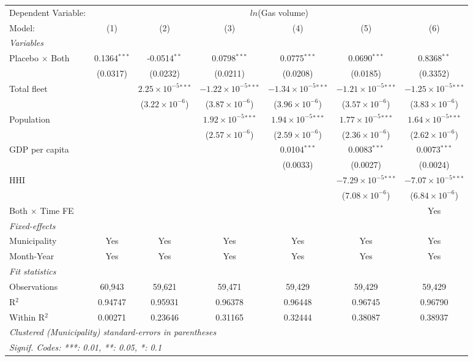 \documentclass[
]{article}
\begin{document}
\begin{tabular}{lcccccc}
\tabularnewline\midrule\midrule
Dependent Variable:&\multicolumn{6}{c}{$ln$(Gas volume)}\\
Model:&(1) & (2) & (3) & (4) & (5) & (6)\\
\midrule \emph{Variables}&   &   &   &   &   &  \\
Placebo $\times $ Both & 0.1364$^{***}$ & -0.0514$^{**}$ & 0.0798$^{***}$ & 0.0775$^{***}$ & 0.0690$^{***}$ & 0.8368$^{**}$\\
  &(0.0317) & (0.0232) & (0.0211) & (0.0208) & (0.0185) & (0.3352)\\
Total fleet &    & $2.25\times 10^{-5}$$^{***}$ & $-1.22\times 10^{-5}$$^{***}$ & $-1.34\times 10^{-5}$$^{***}$ & $-1.21\times 10^{-5}$$^{***}$ & $-1.25\times 10^{-5}$$^{***}$\\
  &   & ($3.22\times 10^{-6}$) & ($3.87\times 10^{-6}$) & ($3.96\times 10^{-6}$) & ($3.57\times 10^{-6}$) & ($3.83\times 10^{-6}$)\\
Population &    &    & $1.92\times 10^{-5}$$^{***}$ & $1.94\times 10^{-5}$$^{***}$ & $1.77\times 10^{-5}$$^{***}$ & $1.64\times 10^{-5}$$^{***}$\\
  &   &    & ($2.57\times 10^{-6}$) & ($2.59\times 10^{-6}$) & ($2.36\times 10^{-6}$) & ($2.62\times 10^{-6}$)\\
GDP per capita &    &    &    & 0.0104$^{***}$ & 0.0083$^{***}$ & 0.0073$^{***}$\\
  &   &    &    & (0.0033) & (0.0027) & (0.0024)\\
HHI &    &    &    &    & $-7.29\times 10^{-5}$$^{***}$ & $-7.07\times 10^{-5}$$^{***}$\\
  &   &    &    &    & ($7.08\times 10^{-6}$) & ($6.84\times 10^{-6}$)\\
Both $\times$ Time FE &  &  &  &  &  & Yes\\
\midrule \emph{Fixed-effects}&   &   &   &   &   &  \\
Municipality & Yes & Yes & Yes & Yes & Yes & Yes\\
Month-Year & Yes & Yes & Yes & Yes & Yes & Yes\\
\midrule \emph{Fit statistics}&  & & & & & \\
Observations & 60,943&59,621&59,471&59,429&59,429&59,429\\
R$^2$ & 0.94747&0.95931&0.96378&0.96448&0.96745&0.96790\\
Within R$^2$ & 0.00271&0.23646&0.31165&0.32444&0.38087&0.38937\\
\midrule\midrule\multicolumn{7}{l}{\emph{Clustered (Municipality) standard-errors in parentheses}}\\
\multicolumn{7}{l}{\emph{Signif. Codes: ***: 0.01, **: 0.05, *: 0.1}}\\
\end{tabular}
\end{document}
